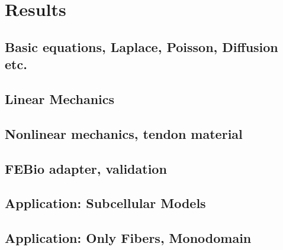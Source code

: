 \chapter{Results}\label{sec:results}

\section{Basic equations, Laplace, Poisson, Diffusion etc.}
\section{Linear Mechanics}
\section{Nonlinear mechanics, tendon material}
\section{FEBio adapter, validation}

\section{Application: Subcellular Models}
\section{Application: Only Fibers, Monodomain}

